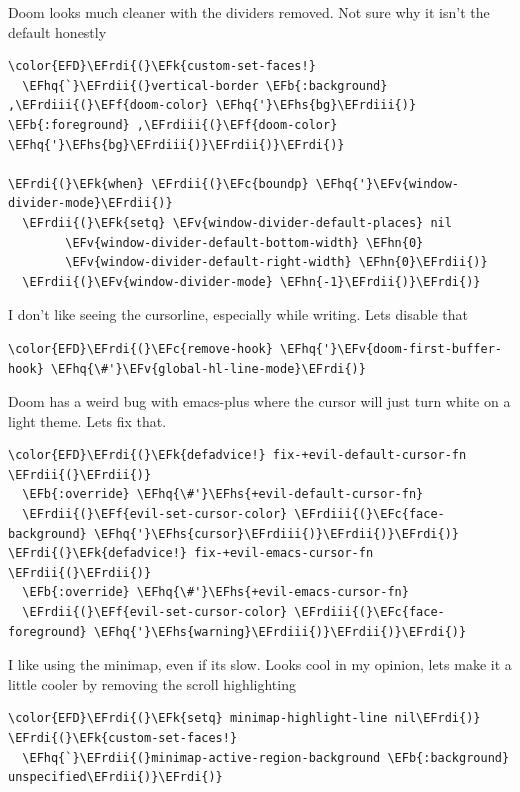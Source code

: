 \documentclass{scrartcl}
\newcommand{\EFk}[1]{\textcolor{EFk}{#1}} %
\newcommand{\EFb}[1]{\textcolor{EFb}{#1}} %
\newcommand{\EFc}[1]{\textcolor{EFc}{#1}} %
\newcommand{\EFv}[1]{\textcolor{EFv}{#1}} %
\newcommand{\EFf}[1]{\textcolor{EFf}{#1}} %
\newcommand{\EFhn}[1]{\textcolor{EFhn}{\textbf{#1}}} %
\newcommand{\EFhq}[1]{\textcolor{EFhq}{#1}} %
\newcommand{\EFhs}[1]{\textcolor{EFhs}{#1}} %
\newcommand{\EFrdi}[1]{\textcolor{EFrdi}{#1}} %
\newcommand{\EFrdii}[1]{\textcolor{EFrdii}{#1}} %
\newcommand{\EFrdiii}[1]{\textcolor{EFrdiii}{#1}} %
\begin{document}
Doom looks much cleaner with the dividers removed. Not sure why it isn't the default honestly
\begin{Code}
\begin{Verbatim}[]
\color{EFD}\EFrdi{(}\EFk{custom-set-faces!}
  \EFhq{`}\EFrdii{(}vertical-border \EFb{:background} ,\EFrdiii{(}\EFf{doom-color} \EFhq{'}\EFhs{bg}\EFrdiii{)} \EFb{:foreground} ,\EFrdiii{(}\EFf{doom-color} \EFhq{'}\EFhs{bg}\EFrdiii{)}\EFrdii{)}\EFrdi{)}

\EFrdi{(}\EFk{when} \EFrdii{(}\EFc{boundp} \EFhq{'}\EFv{window-divider-mode}\EFrdii{)}
  \EFrdii{(}\EFk{setq} \EFv{window-divider-default-places} nil
        \EFv{window-divider-default-bottom-width} \EFhn{0}
        \EFv{window-divider-default-right-width} \EFhn{0}\EFrdii{)}
  \EFrdii{(}\EFv{window-divider-mode} \EFhn{-1}\EFrdii{)}\EFrdi{)}
\end{Verbatim}
\end{Code}

I don't like seeing the cursorline, especially while writing. Lets disable that
\begin{Code}
\begin{Verbatim}[]
\color{EFD}\EFrdi{(}\EFc{remove-hook} \EFhq{'}\EFv{doom-first-buffer-hook} \EFhq{\#'}\EFv{global-hl-line-mode}\EFrdi{)}
\end{Verbatim}
\end{Code}

Doom has a weird bug with emacs-plus where the cursor will just turn white on a light theme. Lets fix that.
\begin{Code}
\begin{Verbatim}[]
\color{EFD}\EFrdi{(}\EFk{defadvice!} fix-+evil-default-cursor-fn \EFrdii{(}\EFrdii{)}
  \EFb{:override} \EFhq{\#'}\EFhs{+evil-default-cursor-fn}
  \EFrdii{(}\EFf{evil-set-cursor-color} \EFrdiii{(}\EFc{face-background} \EFhq{'}\EFhs{cursor}\EFrdiii{)}\EFrdii{)}\EFrdi{)}
\EFrdi{(}\EFk{defadvice!} fix-+evil-emacs-cursor-fn \EFrdii{(}\EFrdii{)}
  \EFb{:override} \EFhq{\#'}\EFhs{+evil-emacs-cursor-fn}
  \EFrdii{(}\EFf{evil-set-cursor-color} \EFrdiii{(}\EFc{face-foreground} \EFhq{'}\EFhs{warning}\EFrdiii{)}\EFrdii{)}\EFrdi{)}
\end{Verbatim}
\end{Code}

I like using the minimap, even if its slow. Looks cool in my opinion, lets make it a little cooler by removing the scroll highlighting
\begin{Code}
\begin{Verbatim}[]
\color{EFD}\EFrdi{(}\EFk{setq} minimap-highlight-line nil\EFrdi{)}
\EFrdi{(}\EFk{custom-set-faces!}
  \EFhq{`}\EFrdii{(}minimap-active-region-background \EFb{:background} unspecified\EFrdii{)}\EFrdi{)}
\end{Verbatim}
\end{Code}
\end{document}
